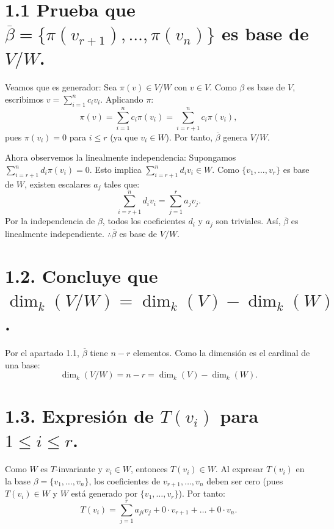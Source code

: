 \documentclass{article}
\begin{document}
\section{1.1 Prueba que \(\overline{\beta} = \{\pi(v_{r+1}), \ldots, \pi(v_n)\}\) es base de \(V/W\).}

Veamos que es generador:  
Sea \(\pi(v) \in V/W\) con \(v \in V\). Como \(\beta\) es base de \(V\), escribimos \(v = \sum_{i=1}^n c_i v_i\). Aplicando \(\pi\):  
\[
\pi(v) = \sum_{i=1}^n c_i \pi(v_i) = \sum_{i=r+1}^n c_i \pi(v_i),
\]  
pues \(\pi(v_i) = 0\) para \(i \leq r\) (ya que \(v_i \in W\)). Por tanto, \(\overline{\beta}\) genera \(V/W\).

Ahora observemos la linealmente independencia:  
Supongamos \(\sum_{i=r+1}^n d_i \pi(v_i) = 0\). Esto implica \(\sum_{i=r+1}^n d_i v_i \in W\). Como \(\{v_1, \ldots, v_r\}\) es base de \(W\), existen escalares \(a_j\) tales que:  
\[
\sum_{i=r+1}^n d_i v_i = \sum_{j=1}^r a_j v_j.
\]  
Por la independencia de \(\beta\), todos los coeficientes \(d_i\) y \(a_j\) son triviales. Así, \(\overline{\beta}\) es linealmente independiente.  
\(\therefore \overline{\beta}\) es base de \(V/W\).

\section{1.2. Concluye que \(\dim_k(V/W) = \dim_k(V) - \dim_k(W)\).}  
Por el apartado 1.1, \(\overline{\beta}\) tiene \(n - r\) elementos. Como la dimensión es el cardinal de una base:  
\[
\dim_k(V/W) = n - r = \dim_k(V) - \dim_k(W).
\]

\section{1.3. Expresión de \(T(v_i)\) para \(1 \leq i \leq r\).}  
Como \(W\) es \(T\)-invariante y \(v_i \in W\), entonces \(T(v_i) \in W\). Al expresar \(T(v_i)\) en la base \(\beta = \{v_1, \ldots, v_n\}\), los coeficientes de \(v_{r+1}, \ldots, v_n\) deben ser cero (pues \(T(v_i) \in W\) y \(W\) está generado por \(\{v_1, \ldots, v_r\}\)). Por tanto:  
\[
T(v_i) = \sum_{j=1}^r a_{ji} v_j + 0 \cdot v_{r+1} + \ldots + 0 \cdot v_n.
\]
\end{document}
